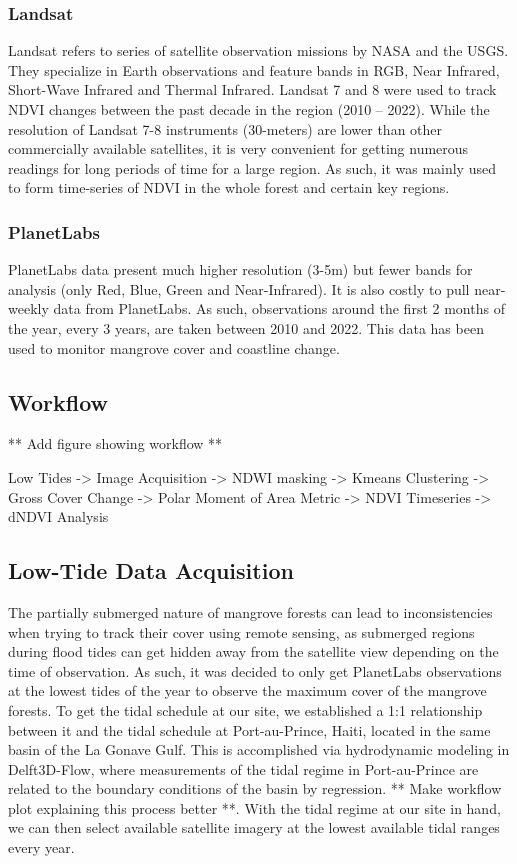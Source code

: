 \documentclass[journal,article,submit,pdftex,moreauthors]{Definitions/mdpi}
\begin{document}
\subsubsection{Landsat}
Landsat refers to series of satellite observation missions by NASA and the USGS. They specialize in Earth observations and feature bands in RGB, Near Infrared, Short-Wave Infrared and Thermal Infrared. Landsat 7 and 8 were used to track NDVI changes between the past decade in the region (2010 – 2022). While the resolution of Landsat 7-8 instruments (30-meters) are lower than other commercially available satellites, it is very convenient for getting numerous readings for long periods of time for a large region. As such, it was mainly used to form time-series of NDVI in the whole forest and certain key regions.

\subsubsection{PlanetLabs}
PlanetLabs data present much higher resolution (3-5m) but fewer bands for analysis (only Red, Blue, Green and Near-Infrared). It is also costly to pull near-weekly data from PlanetLabs. As such, observations around the first 2 months of the year, every 3 years, are taken between 2010 and 2022. This data has been used to monitor mangrove cover and coastline change.

\subsection{Workflow}
** Add figure showing workflow **

Low Tides -> Image Acquisition -> NDWI masking -> Kmeans Clustering -> Gross Cover Change -> Polar Moment of Area Metric -> NDVI Timeseries -> dNDVI Analysis

\subsection{Low-Tide Data Acquisition}
The partially submerged nature of mangrove forests can lead to inconsistencies when trying to track their cover using remote sensing, as submerged regions during flood tides can get hidden away from the satellite view depending on the time of observation. As such, it was decided to only get PlanetLabs observations at the lowest tides of the year to observe the maximum cover of the mangrove forests.
To get the tidal schedule at our site, we established a 1:1 relationship between it and the tidal schedule at Port-au-Prince, Haiti, located in the same basin of the La Gonave Gulf. This is accomplished via hydrodynamic modeling in Delft3D-Flow, where measurements of the tidal regime in Port-au-Prince are related to the boundary conditions of the basin by regression. ** Make workflow plot explaining this process better **. 
With the tidal regime at our site in hand, we can then select available satellite imagery at the lowest available tidal ranges every year. 
\end{document}

